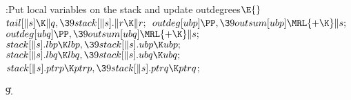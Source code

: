 \B{}:Put local variables on the stack and update outdegrees\X${}\E{}$\6
$\\{tail}[\|s]\K\|q,\39\\{stack}[\|s].\|r\K\|r;{}$\6
${}\\{outdeg}[\\{ubp}]\PP,\39\\{outsum}[\\{ubp}]\MRL{+{\K}}\|s;{}$\6
${}\\{outdeg}[\\{ubq}]\PP,\39\\{outsum}[\\{ubq}]\MRL{+{\K}}\|s;{}$\6
${}\\{stack}[\|s].\\{lbp}\K\\{lbp},\39\\{stack}[\|s].\\{ubp}\K\\{ubp};{}$\6
${}\\{stack}[\|s].\\{lbq}\K\\{lbq},\39\\{stack}[\|s].\\{ubq}\K\\{ubq};{}$\6
${}\\{stack}[\|s].\\{ptrp}\K\\{ptrp},\39\\{stack}[\|s].\\{ptrq}\K\\{ptrq}{}$;%
\par
\U9.\fi

